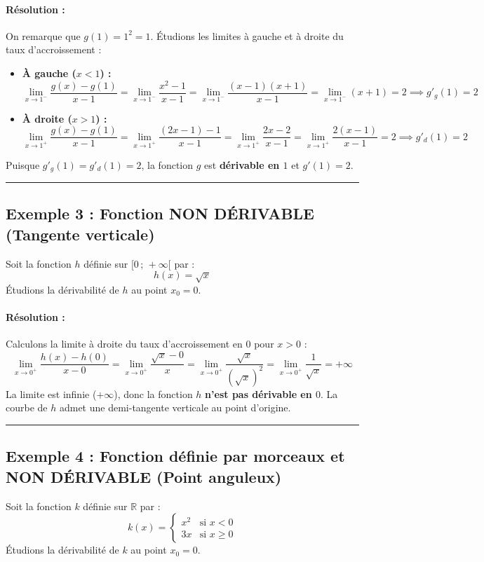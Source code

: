 \documentclass[12pt,a4paper]{article}
\begin{document}
\paragraph{Résolution :}
On remarque que $g(1) = 1^2 = 1$. Étudions les limites à gauche et à droite du taux d'accroissement :
\begin{itemize}
    \item \textbf{À gauche ($x < 1$) :}
    \[
    \lim_{x \to 1^-} \frac{g(x) - g(1)}{x - 1} = \lim_{x \to 1^-} \frac{x^2 - 1}{x - 1} = \lim_{x \to 1^-} \frac{(x-1)(x+1)}{x - 1} = \lim_{x \to 1^-} (x + 1) = 2 \implies g'_g(1) = 2
    \]
    \item \textbf{À droite ($x > 1$) :}
    \[
    \lim_{x \to 1^+} \frac{g(x) - g(1)}{x - 1} = \lim_{x \to 1^+} \frac{(2x - 1) - 1}{x - 1} = \lim_{x \to 1^+} \frac{2x - 2}{x - 1} = \lim_{x \to 1^+} \frac{2(x - 1)}{x - 1} = 2 \implies g'_d(1) = 2
    \]
\end{itemize}
Puisque $g'_g(1) = g'_d(1) = 2$, la fonction $g$ est \textbf{dérivable en $1$} et $g'(1) = 2$.

\vspace{0.3cm}
\hrule
\vspace{0.3cm}

\subsection*{\color{myred}Exemple 3 : Fonction NON DÉRIVABLE (Tangente verticale)}
Soit la fonction $h$ définie sur $[0\,;\,+\infty[$ par :
\[
h(x) = \sqrt{x}
\]
Étudions la dérivabilité de $h$ au point $x_0 = 0$.

\paragraph{Résolution :}
Calculons la limite à droite du taux d'accroissement en $0$ pour $x > 0$ :
\[
\lim_{x \to 0^+} \frac{h(x) - h(0)}{x - 0} = \lim_{x \to 0^+} \frac{\sqrt{x} - 0}{x} = \lim_{x \to 0^+} \frac{\sqrt{x}}{(\sqrt{x})^2} = \lim_{x \to 0^+} \frac{1}{\sqrt{x}} = +\infty
\]
La limite est infinie ($+\infty$), donc la fonction $h$ \textbf{n'est pas dérivable en $0$}. La courbe de $h$ admet une demi-tangente verticale au point d'origine.

\vspace{0.3cm}
\hrule
\vspace{0.3cm}

\subsection*{\color{myred}Exemple 4 : Fonction définie par morceaux et NON DÉRIVABLE (Point anguleux)}
Soit la fonction $k$ définie sur $\mathbb{R}$ par :
\[
k(x) = \begin{cases} 
x^2 & \text{si } x < 0 \\ 
3x & \text{si } x \ge 0 
\end{cases}
\]
Étudions la dérivabilité de $k$ au point $x_0 = 0$.
\end{document}

